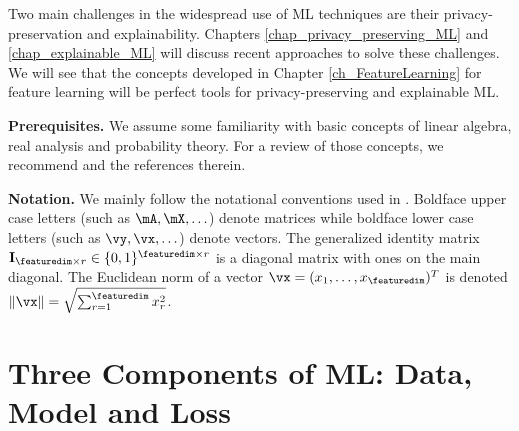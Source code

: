 \documentclass[12pt]{report}
\begin{document}
Two main challenges in the widespread use of ML techniques are their privacy-preservation 
and explainability. Chapters \ref{chap_privacy_preserving_ML} and \ref{chap_explainable_ML} will discuss 
recent approaches to solve these challenges. We will see that the concepts developed in Chapter \ref{ch_FeatureLearning} 
for feature learning will be perfect tools for privacy-preserving and explainable ML. 

{\bf Prerequisites.} We assume some familiarity with basic concepts of linear algebra, real analysis 
and probability theory. For a review of those concepts, we recommend \cite[Chapter 2-4]{Goodfellow-et-al-2016} 
and the references therein. 

{\bf Notation.} We mainly follow the notational conventions used in \cite{Goodfellow-et-al-2016}. 
Boldface upper case letters (such as $\mA,\mX,\ldots$) denote matrices while boldface 
lower case letters (such as $\vy,\vx,\ldots$) denote vectors. The generalized identity 
matrix $\mathbf{I}_{\featuredim \times r} \in \{0,1\}^{\featuredim \times r}$ is a diagonal 
matrix with ones on the main diagonal. The Euclidean norm of a vector $\vx=(x_{1},\ldots,x_{\featuredim})^{T}$ 
is denoted $\| \vx \| = \sqrt{ \sum_{r=1}^{\featuredim} x^{2}_{r}}$. 

\newpage
\chapter{Three Components of ML: Data, Model and Loss} 
\label{ch_Elements_ML}
\end{document}
